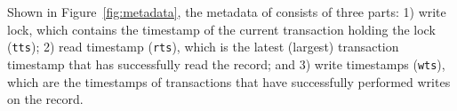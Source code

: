 







Shown in Figure~\ref{fig:metadata},
the metadata of \mvcc consists of three parts:
1) write lock, which contains the timestamp of the current transaction holding the lock (\texttt{tts});
2) read timestamp (\texttt{rts}), which is the latest (largest) transaction timestamp that has successfully read the record; and
3) write timestamps (\texttt{wts}), which are  
the timestamps of transactions that have successfully 
performed writes on the record. 


